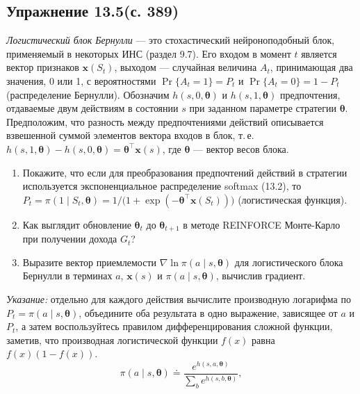 \subsection{Упражнение 13.5(с. 389)}
\emph{Логистический блок Бернулли} --- это стохастический нейроноподобный
блок, применяемый в некоторых ИНС (раздел 9.7). Его входом в момент $t$
является вектор признаков $\mathbf x(S_t)$, выходом --- случайная величина $A_t$,
принимающая два значения, 0 или 1, с вероятностями $\Pr\{A_t=1\}=P_t$ и
$\Pr\{A_t=0\}=1-P_t$ (распределение Бернулли). Обозначим $h(s,0,\boldsymbol\theta)$
и $h(s,1,\boldsymbol\theta)$ предпочтения, отдаваемые двум действиям в состоянии $s$
при заданном параметре стратегии $\boldsymbol\theta$. Предположим, что разность
между предпочтениями действий описывается взвешенной суммой элементов вектора
входов в блок, т.\,е.\ $h(s,1,\boldsymbol\theta)-h(s,0,\boldsymbol\theta)
=\boldsymbol\theta^\top\mathbf x(s)$, где $\boldsymbol\theta$ --- вектор весов блока.
\begin{enumerate}
    \item[(a)] Покажите, что если для преобразования предпочтений действий в
    стратегии используется экспоненциальное распределение softmax (13.2), то
    $P_t=\pi(1\mid S_t,\boldsymbol\theta)=1/\big(1+\exp(-\boldsymbol\theta^\top\mathbf x(S_t))\big)$
    (логистическая функция).
    \item[(b)] Как выглядит обновление $\boldsymbol\theta_t$ до $\boldsymbol\theta_{t+1}$
    в методе REINFORCE Монте-Карло при получении дохода $G_t$?
    \item[(c)] Выразите вектор приемлемости $\nabla\ln\pi(a\mid s,\boldsymbol\theta)$
    для логистического блока Бернулли в терминах $a$, $\mathbf x(s)$ и
    $\pi(a\mid s,\boldsymbol\theta)$, вычислив градиент.
\end{enumerate}
\emph{Указание:} отдельно для каждого действия вычислите производную логарифма
по $P_t=\pi(a\mid s,\boldsymbol\theta)$, объедините оба результата в одно выражение,
зависящее от $a$ и $P_t$, а затем воспользуйтесь правилом дифференцирования
сложной функции, заметив, что производная логистической функции $f(x)$ равна
$f(x)(1-f(x))$.
\begin{equation}
    \pi(a\mid s,\boldsymbol\theta) \doteq
    \frac{e^{h(s,a,\boldsymbol\theta)}}{\sum_b e^{h(s,b,\boldsymbol\theta)}},
    \tag{13.2}
\end{equation}
